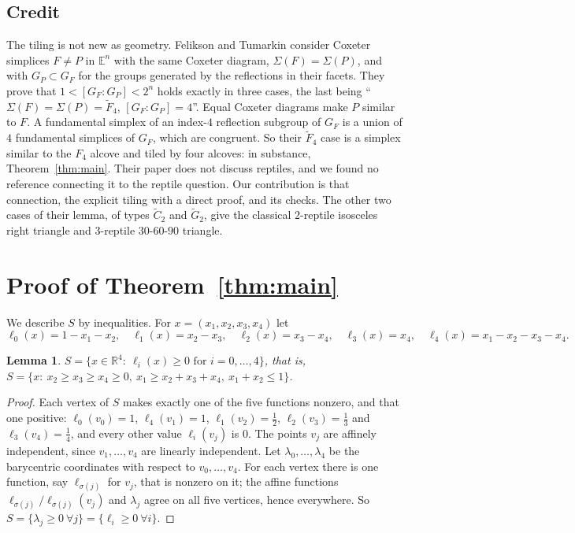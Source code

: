 \documentclass[11pt]{article}
\newtheorem{lemma}[theorem]{Lemma}
\theoremstyle{remark}
\begin{document}
\subsection{Credit}
The tiling is not new as geometry. Felikson and Tumarkin
\cite[Lemma~10]{FT} consider Coxeter simplices $F\ne P$ in $\mathbb{E}^n$
with the same Coxeter diagram, $\Sigma(F)=\Sigma(P)$, and with $G_P\subset
G_F$ for the groups generated by the reflections in their facets. They
prove that $1<[G_F:G_P]<2^n$ holds exactly in three cases, the last being
``$\Sigma(F)=\Sigma(P)=\widetilde F_4$, $[G_F:G_P]=4$''. Equal Coxeter
diagrams make $P$ similar to $F$. A fundamental simplex of an index-$4$
reflection subgroup of $G_F$ is a union of $4$ fundamental simplices of
$G_F$, which are congruent. So their $\widetilde F_4$ case is a simplex
similar to the $F_4$ alcove and tiled by four alcoves: in substance,
Theorem~\ref{thm:main}. Their paper does not discuss reptiles, and we
found no reference connecting it to the reptile question. Our
contribution is that connection, the explicit tiling with a direct
proof, and its checks. The other two cases of their lemma, of types
$\widetilde C_2$ and $\widetilde G_2$, give the classical $2$-reptile
isosceles right triangle and $3$-reptile $30$-$60$-$90$ triangle.

\section{Proof of Theorem~\ref{thm:main}}\label{sec:proof}

We describe $S$ by inequalities. For $x=(x_1,x_2,x_3,x_4)$ let
\[
\ell_0(x)=1-x_1-x_2,\quad \ell_1(x)=x_2-x_3,\quad \ell_2(x)=x_3-x_4,\quad
\ell_3(x)=x_4,\quad \ell_4(x)=x_1-x_2-x_3-x_4 .
\]

\begin{lemma}\label{lem:facets}
$S=\{x\in\mathbb{R}^4:\ \ell_i(x)\ge0 \text{ for } i=0,\dots,4\}$, that is,
$S=\{x:\ x_2\ge x_3\ge x_4\ge0,\ x_1\ge x_2+x_3+x_4,\ x_1+x_2\le1\}$.
\end{lemma}

\begin{proof}
Each vertex of $S$ makes exactly one of the five functions nonzero, and
that one positive: $\ell_0(v_0)=1$, $\ell_4(v_1)=1$, $\ell_1(v_2)=\tfrac12$,
$\ell_2(v_3)=\tfrac13$ and $\ell_3(v_4)=\tfrac14$, and every other value
$\ell_i(v_j)$ is $0$. The points $v_j$ are affinely independent, since
$v_1,\dots,v_4$ are linearly independent. Let $\lambda_0,\dots,\lambda_4$
be the barycentric coordinates with respect to $v_0,\dots,v_4$. For each
vertex there is one function, say $\ell_{\sigma(j)}$ for $v_j$, that is
nonzero on it; the affine functions $\ell_{\sigma(j)}/\ell_{\sigma(j)}(v_j)$
and $\lambda_j$ agree on all five vertices, hence everywhere. So
$S=\{\lambda_j\ge0\ \forall j\}=\{\ell_i\ge0\ \forall i\}$.
\end{proof}
\end{document}
